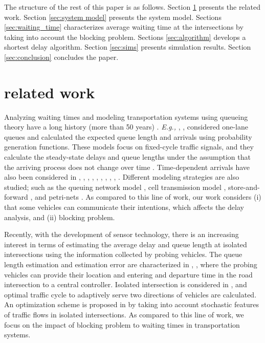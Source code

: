 \documentclass[conference]{IEEEtran}
\newcommand{\Eg}{{\em E.g., }}
\begin{document}
The structure of the rest of this paper is as follows.  Section \ref{sec:related} presents the related work. Section \ref{sec:system model} presents the system model. Sections \ref{sec:waiting_time} characterizes average waiting time at the intersections by taking into account the blocking problem. Sections \ref{sec:algorithm} develops a shortest delay algorithm. Section \ref{sec:sims} presents simulation results. Section \ref{sec:conclusion} concludes the paper.

\vspace{-5pt}
\section{related work}\label{sec:related}
Analyzing waiting times and modeling transportation systems using queueing theory have a long history (more than 50 years) \cite{webster}. \Eg \cite{miller}, \cite{newell}, \cite{dirk} considered one-lane queues and calculated the expected queue length and arrivals using probability generation functions. These models focus on fixed-cycle traffic signals, and they calculate the steady-state delays and queue lengths under the assumption that the arriving process does not change over time \cite{pitu_ning}. Time-dependent arrivals have also been considered in \cite{yang_xianfeng}, \cite{kimber}, \cite{akcelik}, \cite{akcelik_rouphail}, \cite{hunt}, \cite{lowrie}, \cite{henry}, \cite{mirchandani}, \cite{gartner}, \cite{diakaki}. Different modeling strategies are also studied; such as the queuing network model \cite{osorio}, cell transmission model \cite{lo}, store-and-forward \cite{aboudolas}, and petri-nets \cite{febbraro}. As compared to this line of work, our work considers  (i) that some vehicles can communicate their intentions, which affects the delay analysis, and (ii) blocking problem.

Recently, with the development of sensor technology, there is an increasing interest in terms of estimating the average delay and queue length at isolated intersections using the information collected by probing vehicles. The queue length estimation and estimation error are characterized in \cite{gurcan_mecit}, \cite{mandoye_virgil}, where the probing vehicles can provide their location and entering and departure time in the road intersection to a central controller. Isolated intersection is considered in  \cite{pitu_ning}, and optimal traffic cycle to adaptively serve two directions of vehicles are calculated. An optimization scheme is proposed in \cite{guo_yin} by taking into account stochastic features of traffic flows in isolated intersections. As compared to this line of work, we focus on the impact of blocking problem to waiting times in transportation systems.
\end{document}
